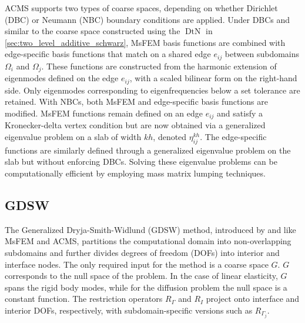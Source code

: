 ACMS supports two types of coarse spaces, depending on whether Dirichlet (DBC) or Neumann (NBC) boundary conditions are applied. Under DBCs and similar to the coarse space constructed using the $\operatorname{DtN}$ in \cref{sec:two_level_additive_schwarz}, MsFEM basis functions are combined with edge-specific basis functions that match on a shared edge $e_{ij}$ between subdomains $\Omega_i$ and $\Omega_j$. These functions are constructed from the harmonic extension of eigenmodes defined on the edge $e_{ij}$, with a scaled bilinear form on the right-hand side. Only eigenmodes corresponding to eigenfrequencies below a set tolerance are retained. With NBCs, both MsFEM and edge-specific basis functions are modified. MsFEM functions remain defined on an edge $e_{ij}$ and satisfy a Kronecker-delta vertex condition but are now obtained via a generalized eigenvalue problem on a slab of width $kh$, denoted $\eta^{kh}_{ij}$. The edge-specific functions are similarly defined through a generalized eigenvalue problem on the slab but without enforcing DBCs. Solving these eigenvalue problems can be computationally efficient by employing mass matrix lumping techniques.
 
\subsection{GDSW}
The Generalized Dryja-Smith-Widlund (GDSW) method, introduced by \cite{gdsw_coarse_space_Dohrmann2008} and like MsFEM and ACMS, partitions the computational domain into non-overlapping subdomains and further divides degrees of freedom (DOFs) into interior and interface nodes. The only required input for the method is a coarse space $G$. $G$ corresponds to the null space of the problem. In the case of linear elasticity, $G$ spans the rigid body modes, while for the diffusion problem the null space is a constant function. The restriction operators $R_{\Gamma}$ and $R_I$ project onto interface and interior DOFs, respectively, with subdomain-specific versions such as $R_{\Gamma_j}$.

